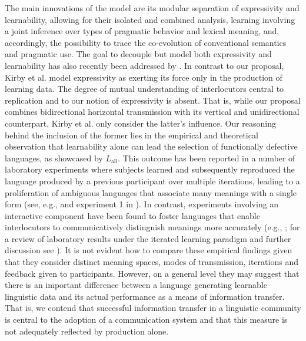 \documentclass[a4paper, 11pt]{article}
\newcommand{\mylang}[1]{\ensuremath{L_{\text{#1}}}\xspace} %
\newcommand{\Lall}{\mylang{all}}
\begin{document}
The main innovations of the model are its modular separation of expressivity and learnability, allowing for their isolated and combined analysis, learning involving a joint inference over types of pragmatic behavior and lexical meaning, and, accordingly, the possibility to trace the co-evolution of conventional semantics and pragmatic use. The goal to decouple but model both expressivity and learnability has also recently been addressed by \citet{kirby+etal:2015}. In contrast to our proposal, Kirby et al. model expressivity as exerting its force only in the production of learning data. The degree of mutual understanding of interlocutors central to replication and to our notion of expressivity is absent. That is, while our proposal combines bidirectional horizontal transmission with its vertical and unidirectional counterpart, Kirby et al. only consider the latter's influence. Our reasoning behind the inclusion of the former lies in the empirical and theoretical observation that learnability alone can lead the selection of functionally defective languages, as showcased by $\Lall$. This outcome has been reported in a number of laboratory experiments where subjects learned and subsequently reproduced the language produced by a previous participant over multiple iterations, leading to a proliferation of ambiguous languages that associate many meanings with a single form (see, e.g., \citealt{silvey+etal:2014} and experiment 1 in \citealt{kirby+etal:2008}). In contrast, experiments involving an interactive component have been found to foster languages that enable interlocutors to communicatively distinguish meanings more accurately  (e.g., \citealt{fay+etal:2013}; for a review of laboratory results under the iterated learning paradigm and further discussion see \citealt{kirby+etal:2015, tamariz+kirby:2016}). It is not evident how to compare these empirical findings given that they consider distinct meaning spaces, modes of transmission, iterations and feedback given to participants. However, on a general level they may suggest that there is an important difference between a language generating learnable linguistic data and its actual performance as a means of information transfer. That is, we contend that successful information transfer in a linguistic community is central to the adoption of a communication system and that this measure is not adequately reflected by production alone.
\end{document}
